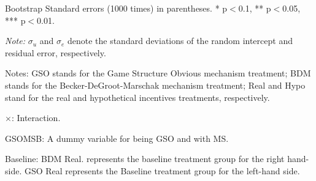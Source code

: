 \documentclass[12pt]{article}
\begin{document}
\begin{table}[H]
{\begin{tabular}{l*{1}{cc}}
    \end{tabular}
    }



\begin{tablenotes}
            \footnotesize
            \item Bootstrap Standard errors (1000 times) in parentheses. * p$<$0.1, ** p$<$0.05, *** p$<$0.01.
            \item \textit{Note:} $\sigma_u$ and $\sigma_e$ denote the standard deviations of the random intercept and residual error, respectively.
            \item Notes: GSO stands for the Game Structure Obvious mechanism treatment; BDM stands for the Becker-DeGroot-Marschak mechanism treatment; Real and Hypo stand for the real and hypothetical incentives treatments, respectively.
           \item $\times$: Interaction.
           \item GSOMSB: A dummy variable for being GSO and with MS.
           \item Baseline: BDM Real. represents the baseline treatment group for the right hand-side.
           GSO Real represents the Baseline treatment group for the left-hand side.
        \end{tablenotes}
\end{table}











\clearpage
\end{document}
